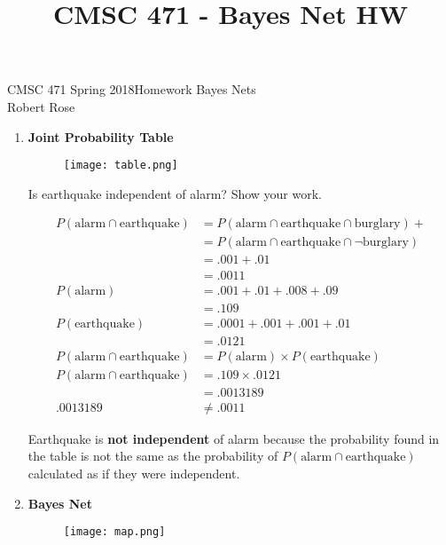 \documentclass[12pt]{article}
\title{CMSC 471 - Bayes Net HW}
\begin{document}
CMSC 471 Spring 2018\hfill Homework Bayes Nets\\
Robert Rose

\hrulefill

\begin{enumerate}
\item \textbf{Joint Probability Table}
\begin{figure}[h!]
  \texttt{[image: table.png]}
  \label{fig:table}
\end{figure}

\vspace{-2em}

Is earthquake independent of alarm? Show your work.\\

\vspace{-3em}

\begin{align*}
        P(\text{alarm} \cap \text{earthquake})
        &= P(\text{alarm} \cap \text{earthquake} \cap \text{burglary}) + \\
        &= P(\text{alarm} \cap \text{earthquake} \cap \neg\text{burglary} )\\
        &= .001 + .01\\
        &= .0011\\
        P(\text{alarm}) &= .001 + .01 + .008 + .09\\
        &= .109\\
        P(\text{earthquake}) &= .0001 + .001 + .001 + .01\\
        &= .0121\\
        P(\text{alarm} \cap \text{earthquake}) &= P(\text{alarm}) \times P(\text{earthquake}) \\
        P(\text{alarm} \cap \text{earthquake}) &= .109 \times .0121\\
        &= .0013189\\
        .0013189 &\neq .0011
    \end{align*}

Earthquake is \textbf{not independent} of alarm because the probability found in the table is not the same as the probability of $P(\text{alarm} \cap \text{earthquake})$ calculated as if they were independent.

\newpage

\item \textbf{Bayes Net}
\begin{figure}[h!]
  \texttt{[image: map.png]}
  \label{fig:map}
\end{figure}


\end{enumerate}
\end{document}
